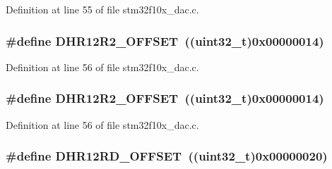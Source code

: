 Definition at line 55 of file stm32f10x\+\_\+dac.\+c.

\subsubsection[{\texorpdfstring{D\+H\+R12\+R2\+\_\+\+O\+F\+F\+S\+ET}{DHR12R2_OFFSET}}]{\setlength{\rightskip}{0pt plus 5cm}\#define D\+H\+R12\+R2\+\_\+\+O\+F\+F\+S\+ET~(({\bf uint32\+\_\+t})0x00000014)}\hypertarget{group___d_a_c___private___defines_ga157b0fbccea090637eea09172fdd6a39}{}\label{group___d_a_c___private___defines_ga157b0fbccea090637eea09172fdd6a39}


Definition at line 56 of file stm32f10x\+\_\+dac.\+c.

\subsubsection[{\texorpdfstring{D\+H\+R12\+R2\+\_\+\+O\+F\+F\+S\+ET}{DHR12R2_OFFSET}}]{\setlength{\rightskip}{0pt plus 5cm}\#define D\+H\+R12\+R2\+\_\+\+O\+F\+F\+S\+ET~(({\bf uint32\+\_\+t})0x00000014)}\hypertarget{group___d_a_c___private___defines_ga157b0fbccea090637eea09172fdd6a39}{}\label{group___d_a_c___private___defines_ga157b0fbccea090637eea09172fdd6a39}


Definition at line 56 of file stm32f10x\+\_\+dac.\+c.

\subsubsection[{\texorpdfstring{D\+H\+R12\+R\+D\+\_\+\+O\+F\+F\+S\+ET}{DHR12RD_OFFSET}}]{\setlength{\rightskip}{0pt plus 5cm}\#define D\+H\+R12\+R\+D\+\_\+\+O\+F\+F\+S\+ET~(({\bf uint32\+\_\+t})0x00000020)}\hypertarget{group___d_a_c___private___defines_ga2893b0491ec29a95fd061e5e0fa029e3}{}\label{group___d_a_c___private___defines_ga2893b0491ec29a95fd061e5e0fa029e3}


